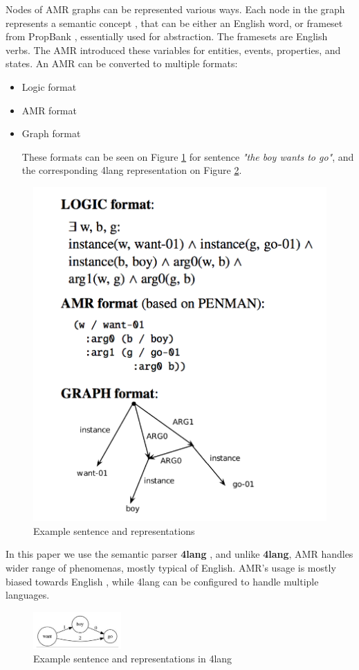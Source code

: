 Nodes of AMR graphs can be represented various ways. Each node in the graph represents a semantic concept \cite{AMR:2015}, that can be either an English word, or frameset from PropBank \cite{Palmer:2005}, essentially used for abstraction. The framesets are English verbs. The AMR introduced these variables for entities, events, properties, and states. An AMR can be converted to multiple formats:
\begin{itemize}
	\item Logic format
	\item AMR format
	\item Graph format
	
	These formats can be seen on Figure \ref{fig:amr} for sentence \textit{"the boy wants to go"}, and the corresponding 4lang representation on Figure \ref{fig:4langboy}.
	
\end{itemize}

\begin{figure}[h!]
	\centering
	\includegraphics[height=0.4\textwidth]{figures/amr}
	\caption{Example sentence and representations \cite{Palmer:2005}}
	\label{fig:amr}
\end{figure}

In this paper we use the semantic parser \textbf{4lang} \cite{Recski:2018}, and unlike \textbf{4lang}, AMR handles wider range of phenomenas, mostly typical of English. AMR's usage is mostly biased towards English \cite{Palmer:2005}, while 4lang can be configured to handle multiple languages.

\begin{figure}[h!]
	\centering
	\includegraphics[width=0.3\textwidth]{figures/4langboy}
	\caption{Example sentence and representations in 4lang}
	\label{fig:4langboy}
\end{figure}

